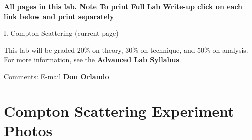 \documentclass{../lab}
\begin{document}
\textbf{All pages in this lab. Note To print Full Lab Write-up click on each link below and print separately }

I. Compton Scattering (current page)

This lab will be graded 20\% on theory, 30\% on technique, and 50\% on analysis. For more information, see the \href{http://experimentationlab.berkeley.edu/syllabus}{\textbf{Advanced Lab Syllabus}}.

Comments: E-mail \href{\MailDonOrlando}{\textbf{Don Orlando}}

\pagebreak

\section{Compton Scattering Experiment Photos}
\end{document}
